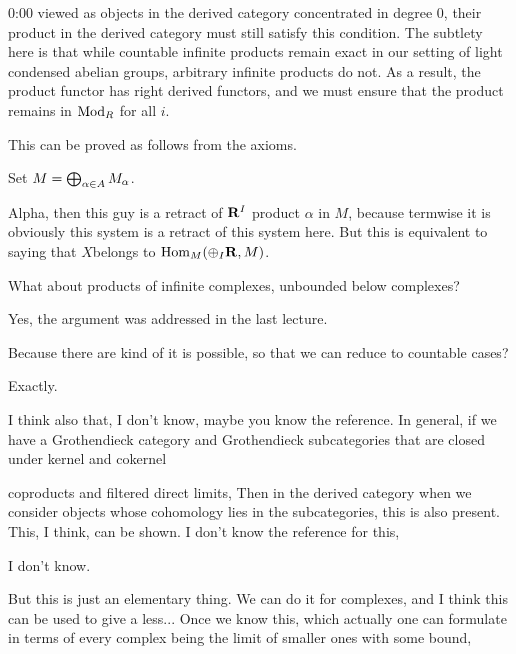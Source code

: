 \begin{unfinished}{0:00}
viewed as objects in the derived category concentrated in degree 0, their product in the derived category must still satisfy this condition.
The subtlety here is that while countable infinite products remain exact in our setting of light condensed abelian groups, arbitrary infinite products do not.
As a result, the product functor has right derived functors, and we must ensure that the product remains in $\operatorname{Mod}_R$ for all $i$.


 
 
This can be proved as follows from the axioms.

Set $M = \bigoplus_{\alpha \in A} M_\alpha$.

% 
Alpha, then this guy is a retract of $\mathbf R^I$ product $\alpha$ in $M$, because termwise it is obviously this system is a retract of this system here. But this is equivalent to saying that $X$belongs to $\operatorname{Hom}_M(\oplus_I \mathbf R, M)$. 

\ques What about products of infinite complexes, unbounded below complexes? 

\ans Yes, the argument was addressed in the last lecture.

\ques Because there are kind of it is possible, so that we can reduce to countable cases? 

\ans Exactly.

\ques I think also that, I don't know, maybe you know the reference. In general, if we have a Grothendieck category and Grothendieck subcategories that are closed under kernel and cokernel  %

 coproducts and filtered direct limits,
Then in the derived category when we consider objects whose cohomology lies in the subcategories, this is also present. This, I think, can be shown. I don't know the reference for this, 

\ans I don't know. 


\ques But this is just an elementary thing. We can do it for complexes, and I think this can be used to give a less... Once we know this, which actually one can formulate in terms of every complex being the limit of smaller ones with some bound, %


\end{unfinished}
